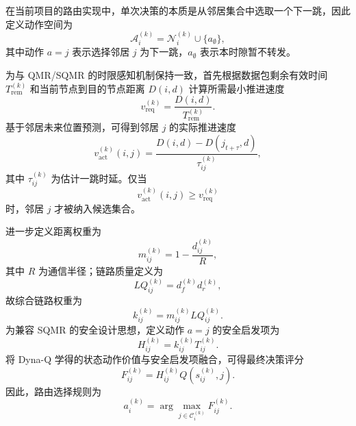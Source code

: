 在当前项目的路由实现中，单次决策的本质是从邻居集合中选取一个下一跳，因此定义动作空间为
\begin{equation}
\mathcal{A}_i^{(k)}=\mathcal{N}_i^{(k)}\cup\{a_{\emptyset}\},
\end{equation}
其中动作 $a=j$ 表示选择邻居 $j$ 为下一跳，$a_{\emptyset}$ 表示本时隙暂不转发。

为与 QMR/SQMR 的时限感知机制保持一致，首先根据数据包剩余有效时间 $T_{\mathrm{rem}}^{(k)}$ 和当前节点到目的节点距离 $D(i,d)$ 计算所需最小推进速度
\begin{equation}
v_{\mathrm{req}}^{(k)}=\frac{D(i,d)}{T_{\mathrm{rem}}^{(k)}}.
\end{equation}
基于邻居未来位置预测，可得到邻居 $j$ 的实际推进速度
\begin{equation}
v_{\mathrm{act}}^{(k)}(i,j)=
\frac{D(i,d)-D(j_{t+\tau},d)}{\tau_{ij}^{(k)}},
\end{equation}
其中 $\tau_{ij}^{(k)}$ 为估计一跳时延。仅当
\begin{equation}
v_{\mathrm{act}}^{(k)}(i,j)\ge v_{\mathrm{req}}^{(k)}
\end{equation}
时，邻居 $j$ 才被纳入候选集合。

进一步定义距离权重为
\begin{equation}
m_{ij}^{(k)}=1-\frac{d_{ij}^{(k)}}{R},
\end{equation}
其中 $R$ 为通信半径；链路质量定义为
\begin{equation}
LQ_{ij}^{(k)} = d_f^{(k)} d_r^{(k)},
\end{equation}
故综合链路权重为
\begin{equation}
k_{ij}^{(k)}=m_{ij}^{(k)}LQ_{ij}^{(k)}.
\end{equation}
为兼容 SQMR 的安全设计思想，定义动作 $a=j$ 的安全启发项为
\begin{equation}
H_{ij}^{(k)} = k_{ij}^{(k)} T_{ij}^{(k)}.
\end{equation}
将 Dyna-Q 学得的状态动作价值与安全启发项融合，可得最终决策评分
\begin{equation}
F_{ij}^{(k)} = H_{ij}^{(k)} Q(s_{ij}^{(k)},j).
\end{equation}
因此，路由选择规则为
\begin{equation}
a_i^{(k)}=\arg\max_{j\in\mathcal{C}_i^{(k)}} F_{ij}^{(k)}.
\end{equation}

